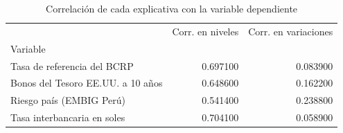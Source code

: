 \begin{table}
\caption{Correlación de cada explicativa con la variable dependiente}
\label{tab:corr_Y}
\begin{tabular}{lrr}
\toprule
 & Corr. en niveles & Corr. en variaciones \\
Variable &  &  \\
\midrule
Tasa de referencia del BCRP & 0.697100 & 0.083900 \\
Bonos del Tesoro EE.UU. a 10 años & 0.648600 & 0.162200 \\
Riesgo país (EMBIG Perú) & 0.541400 & 0.238800 \\
Tasa interbancaria en soles & 0.704100 & 0.058900 \\
\bottomrule
\end{tabular}
\end{table}
